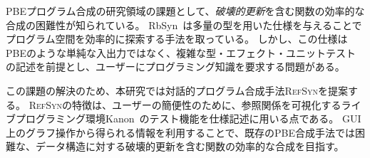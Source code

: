 \documentclass[11pt, a4paper, oneside, twocolumn]{jsarticle}
\newcommand{\mysys}{\textsc{RefSyn}}
\begin{document}
PBEプログラム合成の研究領域の課題として、\emph{破壊的更新}を含む関数の効率的な合成の困難性が知られている。
RbSyn~\cite{rbsyn}は多量の型を用いた仕様を与えることでプログラム空間を効率的に探索する手法を取っている。
しかし、この仕様はPBEのような単純な入出力ではなく、複雑な型・エフェクト・ユニットテストの記述を前提とし、ユーザーにプログラミング知識を要求する問題がある。


この課題の解決のため、本研究では対話的プログラム合成手法\mysys{}を提案する。
\mysys{}の特徴は、ユーザーの簡便性のために、参照関係を可視化するライブプログラミング環境Kanon~\cite{kanon}のテスト機能を仕様記述に用いる点である。
GUI上のグラフ操作から得られる情報を利用することで、既存のPBE合成手法では困難な、データ構造に対する破壊的更新を含む関数の効率的な合成を目指す。

\end{document}
